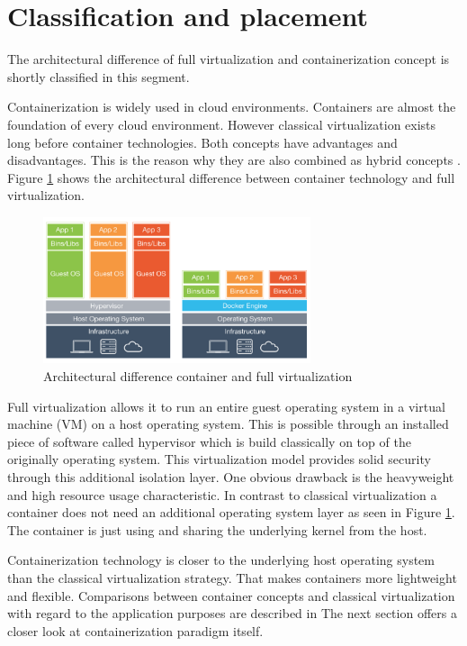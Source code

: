 \section{Classification and placement}
\label{sec:intro:virt_and_cont}
The architectural difference of full virtualization and containerization concept is shortly classified in this segment.

Containerization is widely used in cloud environments. Containers are almost the foundation of every cloud environment.
However classical virtualization exists long before container technologies.
Both concepts have advantages and disadvantages. 
This is the reason why they are also combined as hybrid concepts \cite{6498558}.
Figure \ref{fig:intro:diff_container_vm} shows the architectural difference between container technology and full virtualization. 
\begin{figure}[htbp]
 \centering
 \includegraphics[width=0.7\textwidth]{gfx/examples/os_virt_diff}
 \caption{Architectural difference container and full virtualization}
 \label{fig:intro:diff_container_vm}
\end{figure}
Full virtualization allows it to run an entire guest operating system in a virtual machine (VM) on a host operating system. 
This is possible through an installed piece of software called hypervisor which is build classically on top of the originally operating system. 
This virtualization model provides solid security through this additional isolation layer. 
One obvious drawback is the heavyweight and high resource usage characteristic.
In contrast to classical virtualization a container does not need an additional operating system layer as seen in Figure \ref{fig:intro:diff_container_vm}. 
The container is just using and sharing the underlying kernel from the host. 

Containerization technology is closer to the underlying host operating system than the classical virtualization strategy. 
That makes containers more lightweight and flexible. 
Comparisons between container concepts and classical virtualization with regard to the application purposes are described in \cite{7921010}
The next section offers a closer look at containerization paradigm itself.

